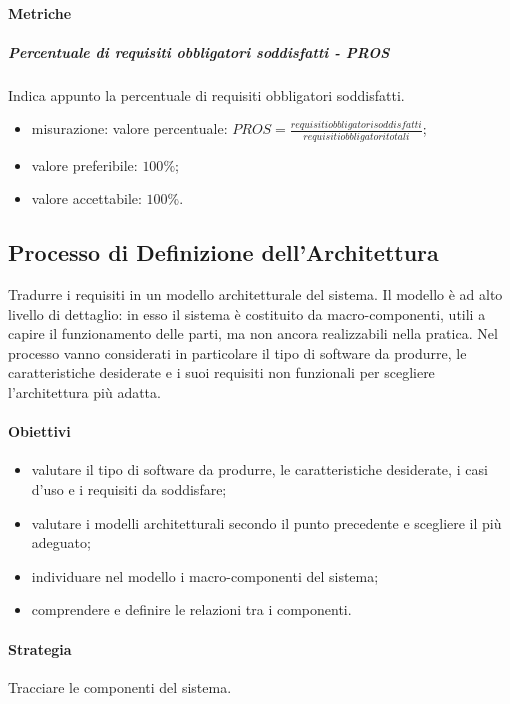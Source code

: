 		\paragraph{Metriche}
			\subparagraph{Percentuale di requisiti obbligatori soddisfatti - PROS} Indica appunto la percentuale di requisiti obbligatori soddisfatti.
			\begin{itemize}
				\item misurazione: valore percentuale: $ PROS = \frac{requisiti obbligatori soddisfatti}{requisiti obbligatori totali}$;
				\item valore preferibile: $100\%$;
				\item valore accettabile: $100\%$.
			\end{itemize}
		
	\subsection{Processo di Definizione dell'Architettura}
	Tradurre i requisiti in un modello architetturale del sistema.
	Il modello è ad alto livello di dettaglio: in esso il sistema è costituito da macro-componenti, utili a capire il funzionamento delle parti, ma non ancora realizzabili nella pratica.\newline
	Nel processo vanno considerati in particolare il tipo di software da produrre, le caratteristiche desiderate e i suoi requisiti non funzionali per scegliere l'architettura più adatta.
		\paragraph{Obiettivi}
		\begin{itemize}
			\item valutare il tipo di software da produrre, le caratteristiche desiderate, i casi d'uso e i requisiti da soddisfare;
			\item valutare i modelli architetturali secondo il punto precedente e scegliere il più adeguato;
			\item individuare nel modello i macro-componenti del sistema;
			\item comprendere e definire le relazioni tra i componenti.
		\end{itemize}
		\paragraph{Strategia}
		Tracciare le componenti del sistema.
